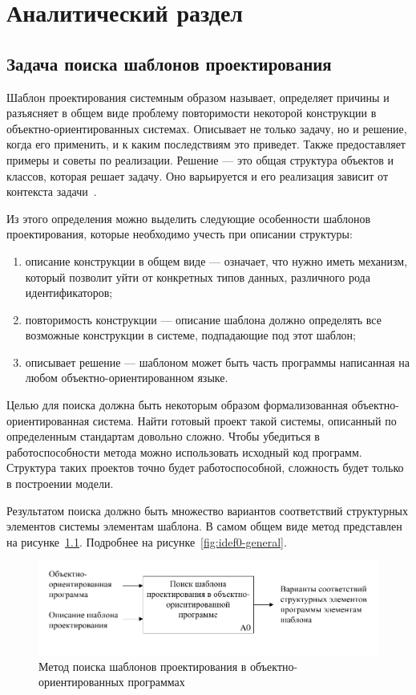 \chapter{Аналитический раздел}
\label{cha:analysis}

\section{Задача поиска шаблонов проектирования}

Шаблон проектирования системным образом называет, определяет причины и
разъясняет в общем виде проблему повторимости некоторой конструкции в
объектно-ориентированных системах.
Описывает не только задачу, но и решение, когда его применить, и к каким
последствиям это приведет.
Также предоставляет примеры и советы по реализации.
Решение --- это общая структура объектов и классов, которая решает задачу.
Оно варьируется и его реализация зависит от контекста задачи~\cite{DesignPatterns}.

Из этого определения можно выделить следующие особенности шаблонов проектирования,
которые необходимо учесть при описании структуры:
\begin{enumerate}
\item описание конструкции в общем виде --- означает, что нужно иметь механизм,
который позволит уйти от конкретных типов данных, различного рода идентификаторов;
\item повторимость конструкции --- описание шаблона должно определять все
возможные конструкции в системе, подпадающие под этот шаблон;
\item описывает решение --- шаблоном может быть часть программы написанная на
любом объектно-ориентированном языке.
\end{enumerate}

Целью для поиска должна быть некоторым образом формализованная
объектно-ориентированная система.
Найти готовый проект такой системы, описанный по определенным стандартам
довольно сложно.
Чтобы убедиться в работоспособности метода можно использовать исходный код
программ.
Структура таких проектов точно будет работоспособной, сложность будет только
в построении модели.

Результатом поиска должно быть множество вариантов соответствий структурных
элементов системы элементам шаблона.
В самом общем виде метод представлен на рисунке~\ref{fig:idef0}.
Подробнее на рисунке~\ref{fig:idef0-general}.

\begin{figure}
\centering
\includegraphics[width=\textwidth]{inc/idef0.pdf}
\caption{Метод поиска шаблонов проектирования в объектно-ориентированных программах}
\label{fig:idef0}
\end{figure}

